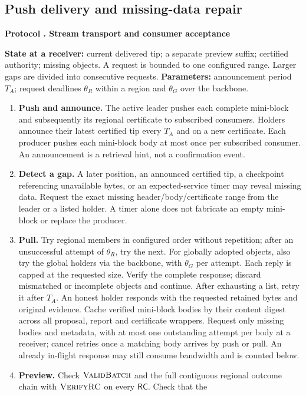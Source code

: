 \documentclass[11pt,a4paper,onecolumn]{article}
\newcommand{\RC}{\mathsf{RC}}
\newcommand{\Proc}[1]{\textnormal{\textsc{#1}}}
\theoremstyle{remark}\newtheorem{example}[definition]{Example}
\newcounter{protocol}
\newenvironment{protocol}[2]{\refstepcounter{protocol}\label{#1}\begin{mdframed}[nobreak=true,linewidth=.6pt,skipabove=10pt,skipbelow=10pt,innertopmargin=8pt,innerbottommargin=8pt]\small\raggedright\noindent\textbf{Protocol \theprotocol. #2}\par\smallskip}{\end{mdframed}}
\begin{document}
\subsection{Push delivery and missing-data repair}\label{sec:pull}
\begin{protocol}{alg:pull}{Stream transport and consumer acceptance}
\textbf{State at a receiver:} current delivered tip; a separate preview suffix;
certified authority; missing objects. A request is bounded to one configured
range. Larger gaps are divided into consecutive requests.
\textbf{Parameters:} announcement period $T_A$; request deadlines $\theta_R$
within a region and $\theta_G$ over the backbone.
\begin{enumerate}[label=\textbf{D\arabic*.}]
\item \textbf{Push and announce.} The active leader pushes each complete
mini-block and subsequently its regional certificate to subscribed consumers.
Holders announce their latest certified tip every $T_A$ and on a new certificate.
Each producer pushes each mini-block body at most once per subscribed consumer.
An announcement is a retrieval hint, not a confirmation event.
\item \textbf{Detect a gap.} A later position, an announced certified tip,
a checkpoint referencing unavailable bytes, or an expected-service timer may
reveal missing data. Request the exact missing header/body/certificate range
from the leader or a listed holder. A timer alone does not fabricate an empty
mini-block or replace the producer.
\item \textbf{Pull.} Try regional members in configured order without repetition;
after an unsuccessful attempt of $\theta_R$, try the next. For globally adopted
objects, also try the global holders via the backbone, with $\theta_G$ per attempt.
Each reply is capped at the requested size. Verify the complete response;
discard mismatched or incomplete objects and continue. After exhausting a list,
retry it after $T_A$. An honest holder responds with the requested retained
bytes and original evidence. Cache verified mini-block bodies by their content
digest across all proposal, report and certificate wrappers. Request only
missing bodies and metadata, with at most one outstanding attempt per body
at a receiver; cancel retries once a matching body arrives by push or pull.
An already in-flight response may still consume bandwidth and is counted below.
\item \textbf{Preview.} Check $\Proc{ValidBatch}$ and the full contiguous
regional outcome chain with $\Proc{VerifyRC}$ on every $\RC$. Check that the

\end{enumerate}
\end{protocol}
\end{document}
